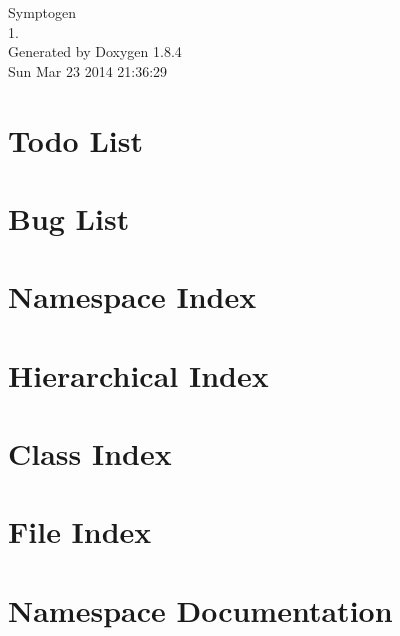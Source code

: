 \documentclass[twoside]{book}
\newcommand{\clearemptydoublepage}{%
  \newpage{\pagestyle{empty}\cleardoublepage}%
}
\begin{document}
\hypersetup{pageanchor=false}
\begin{titlepage}
\vspace*{7cm}
\begin{center}%
{\Large Symptogen \\[1ex]\large 1. }\\
\vspace*{1cm}
{\large Generated by Doxygen 1.8.4}\\
\vspace*{0.5cm}
{\small Sun Mar 23 2014 21:36:29}\\
\end{center}
\end{titlepage}
\clearemptydoublepage
\tableofcontents
\clearemptydoublepage
{}
\hypersetup{pageanchor=true}

\chapter{Todo List}
\label{todo}
\hypertarget{todo}{}

\chapter{Bug List}
\label{bug}
\hypertarget{bug}{}

\chapter{Namespace Index}

\chapter{Hierarchical Index}

\chapter{Class Index}

\chapter{File Index}

\chapter{Namespace Documentation}

\end{document}
